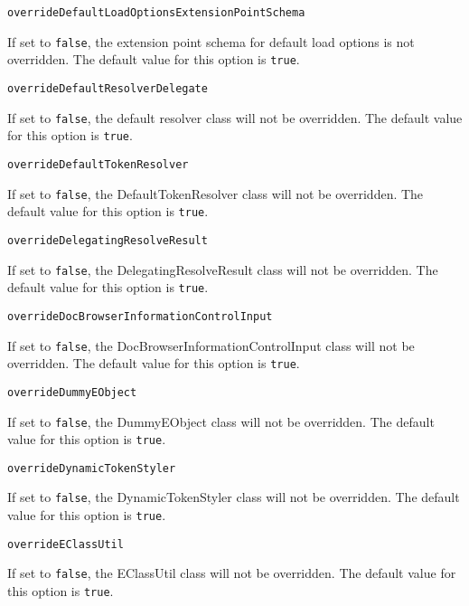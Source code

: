 \noindent\texttt{overrideDefaultLoadOptionsExtensionPointSchema}
\begin{myindentpar}{1cm}
If set to \texttt{false}, the extension point schema for default load options is not overridden. The default value for this option is \texttt{true}.
\end{myindentpar}

\noindent\texttt{overrideDefaultResolverDelegate}
\begin{myindentpar}{1cm}
If set to \texttt{false}, the default resolver class will not be overridden. The default value for this option is \texttt{true}.
\end{myindentpar}

\noindent\texttt{overrideDefaultTokenResolver}
\begin{myindentpar}{1cm}
If set to \texttt{false}, the DefaultTokenResolver class will not be overridden. The default value for this option is \texttt{true}.
\end{myindentpar}

\noindent\texttt{overrideDelegatingResolveResult}
\begin{myindentpar}{1cm}
If set to \texttt{false}, the DelegatingResolveResult class will not be overridden. The default value for this option is \texttt{true}.
\end{myindentpar}

\noindent\texttt{overrideDocBrowserInformationControlInput}
\begin{myindentpar}{1cm}
If set to \texttt{false}, the DocBrowserInformationControlInput class will not be overridden. The default value for this option is \texttt{true}.
\end{myindentpar}

\noindent\texttt{overrideDummyEObject}
\begin{myindentpar}{1cm}
If set to \texttt{false}, the DummyEObject class will not be overridden. The default value for this option is \texttt{true}.
\end{myindentpar}

\noindent\texttt{overrideDynamicTokenStyler}
\begin{myindentpar}{1cm}
If set to \texttt{false}, the DynamicTokenStyler class will not be overridden. The default value for this option is \texttt{true}.
\end{myindentpar}

\noindent\texttt{overrideEClassUtil}
\begin{myindentpar}{1cm}
If set to \texttt{false}, the EClassUtil class will not be overridden. The default value for this option is \texttt{true}.
\end{myindentpar}

